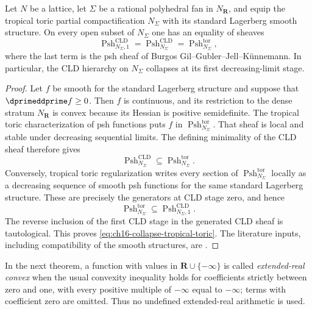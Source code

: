 \begin{proposition}
\label{prop:ch16-collapse-tropical-toric}
Let $N$ be a lattice, let $\Sigma$ be a rational polyhedral fan in
$N_{\mathbf R}$, and equip the tropical toric partial compactification
$N_\Sigma$ with its standard Lagerberg smooth structure.  On every open
subset of $N_\Sigma$ one has an equality of sheaves
\begin{equation}
\label{eq:ch16-collapse-tropical-toric}
 \operatorname{Psh}^{\mathrm{CLD}}_{N_\Sigma,1}
 =\operatorname{Psh}^{\mathrm{CLD}}_{N_\Sigma}
 =\operatorname{Psh}^{\mathrm{tor}}_{N_\Sigma},
\end{equation}
where the last term is the psh sheaf of Burgos
Gil--Gubler--Jell--K\"unnemann.  In particular, the CLD hierarchy on
$N_\Sigma$ collapses at its first decreasing-limit stage.
\end{proposition}

\begin{proof}
Let $f$ be smooth for the standard Lagerberg structure and suppose that
$\dprimeddprime f\geq0$.  Then $f$ is continuous, and its restriction to
the dense stratum $N_{\mathbf R}$ is convex because its Hessian is positive
semidefinite.  The tropical toric characterization of psh functions puts
$f$ in $\operatorname{Psh}^{\mathrm{tor}}_{N_\Sigma}$.  That sheaf is local
and stable under decreasing sequential limits.  The defining minimality of
the CLD sheaf therefore gives
\[
 \operatorname{Psh}^{\mathrm{CLD}}_{N_\Sigma}
 \subseteq\operatorname{Psh}^{\mathrm{tor}}_{N_\Sigma}.
\]
Conversely, tropical toric regularization writes every section of
$\operatorname{Psh}^{\mathrm{tor}}_{N_\Sigma}$ locally as a decreasing
sequence of smooth psh functions for the same standard Lagerberg structure.
These are precisely the generators at CLD stage zero, and hence
\[
 \operatorname{Psh}^{\mathrm{tor}}_{N_\Sigma}
 \subseteq\operatorname{Psh}^{\mathrm{CLD}}_{N_\Sigma,1}.
\]
The reverse inclusion of the first CLD stage in the generated CLD sheaf is
tautological.  This proves \eqref{eq:ch16-collapse-tropical-toric}.  The
literature inputs, including compatibility of the smooth structures, are
\cite[Definition~3.1.2, Proposition~3.1.3 and Theorems~3.1.4,
3.3.4]{BGJKK25}.
\end{proof}

In the next theorem, a function with values in
$\mathbf R\cup\{-\infty\}$ is called \emph{extended-real convex} when the
usual convexity inequality holds for coefficients strictly between zero and
one, with every positive multiple of $-\infty$ equal to $-\infty$; terms
with coefficient zero are omitted.  Thus no undefined extended-real
arithmetic is used.

